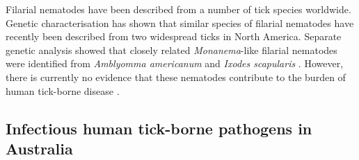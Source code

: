 \documentclass[a4paper, nobind]{templates/ociamthesis}
\begin{document}
Filarial nematodes have been described from a number of tick species worldwide.
Genetic characterisation has shown that similar species of filarial nematodes have recently been described from two widespread ticks in North America.
Separate genetic analysis showed that closely related \emph{Monanema}-like filarial nematodes were identified from \emph{Amblyomma americanum} \autocite{henningDiscoveryFilarialNematode2016} and \emph{Ixodes scapularis} \autocite{tokarzCharacterizationMonanemaNematode2020}.
However, there is currently no evidence that these nematodes contribute to the burden of human tick-borne disease \autocite{tokarzCharacterizationMonanemaNematode2020}.

\hypertarget{infectious-human-tick-borne-pathogens-in-australia}{%
\subsection{Infectious human tick-borne pathogens in Australia}\label{infectious-human-tick-borne-pathogens-in-australia}}
\end{document}
